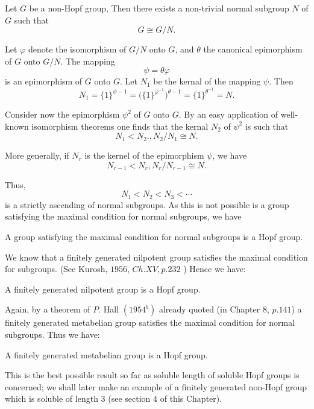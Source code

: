 Let $G$ be a non-Hopf group, Then there exists a non-trivial normal
subgroup $N$ of $G$ such that  
$$
G \cong G/N. 
$$ 

Let $\varphi$ denote the isomorphism of $G/N$ onto $G$, and $\theta$
the canonical epimorphism of $G$ onto $G/N$. The mapping 
$$
\psi = \theta \varphi 
$$ 
is an epimorphism of $G$ onto $G$. Let $N_1$ be the kernal of the
mapping $\psi$. Then  
$$
N_1 = \{ 1\}^{\psi -1} =  \bigg( \{ 1\}^{\varphi ^{-1}}\bigg)^{\theta
  -1}  = \{ 1\}^{\theta ^{-1}} =N. 
$$

Consider now the epimorphism $\psi^2$ of $G$ onto $G$. By an easy
application  of well-known isomorphism theorems one finds that the
kernal $N_2$ of $\psi^2$ is such that 
$$
N_1 <N_2., N_2 /N_1 \cong N.
$$

More generally, if $N_r$ is the kernel of the epimorphism $\psi$, we have 
$$
N_{r-1} < N_r, N_r/ N_{r-1} \cong N.
$$

Thus,
$$
N_1 <  N_2 < N_3 < \cdots 
$$
is a strictly  ascending of normal subgroups. As this is not possible
is a group satisfying the maximal condition for normal subgroups, we
have  
\setcounter{Theorem}{0}
\begin{Theorem}%
  A group satisfying the maximal condition for normal subgroups is a
  Hopf group.  
\end{Theorem}

We know that a finitely generated nilpotent group satisfies the
maximal condition for subgroups. (See Kurosh, $1956$, $Ch. XV,
p. 232$ ) Hence we have: 
\setcounter{corollary}{0}
\begin{corollary}%
  A finitely generated nilpotent group is a Hopf group.
\end{corollary}

Again, by a theorem of $P$. Hall $(1954^b)$ already quoted (in Chapter
$8$, $p. 141$) a finitely generated metabelian group satisfies the
maximal condition for normal subgroups. Thus we have: 
\begin{corollary}%
  A finitely generated metabelian group is a Hopf group.
\end{corollary}

This is the best possible result so far as soluble length of soluble
Hopf groups is concerned; we shall later make an example of a finitely
generated non-Hopf group which is soluble of length $3$ (see section
$4$ of this Chapter). 

\section{}%


